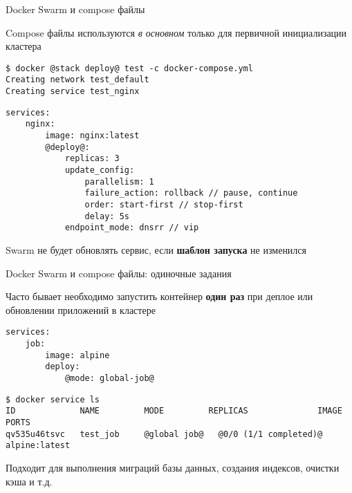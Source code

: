 \begin{frame}[fragile]{Docker Swarm и compose файлы}

Compose файлы используются \textit{в основном} только для первичной инициализации кластера

\begin{tcolorbox-code}
\begin{lstlisting}[style=base]
$ docker @stack deploy@ test -c docker-compose.yml
Creating network test_default
Creating service test_nginx

\end{lstlisting}
\end{tcolorbox-code}


\begin{tcolorbox-code}
\begin{lstlisting}[style=base]
services:
    nginx:
        image: nginx:latest
        @deploy@:
            replicas: 3
            update_config:
                parallelism: 1
                failure_action: rollback // pause, continue
                order: start-first // stop-first
                delay: 5s
            endpoint_mode: dnsrr // vip
\end{lstlisting}
\end{tcolorbox-code}

Swarm {\color{good} не будет обновлять сервис}, если \textbf{шаблон запуска} не изменился

\end{frame}

\begin{frame}[fragile]{Docker Swarm и compose файлы: одиночные задания}

Часто бывает необходимо запустить контейнер \textbf{один раз} при деплое или обновлении приложений в кластере


\begin{tcolorbox-code}
\begin{lstlisting}[style=base]
services:
    job:
        image: alpine
        deploy:
            @mode: global-job@
    \end{lstlisting}
\end{tcolorbox-code}

\begin{tcolorbox-code}
\begin{lstlisting}[style=base]
$ docker service ls
ID             NAME         MODE         REPLICAS              IMAGE           PORTS
qv535u46tsvc   test_job     @global job@   @0/0 (1/1 completed)@   alpine:latest   
\end{lstlisting}
\end{tcolorbox-code}

Подходит для выполнения миграций базы данных, создания индексов, очистки кэша и т.д.

\end{frame}

